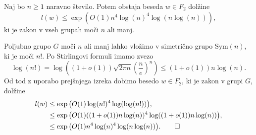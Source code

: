 \begin{posledica}\label{psl_zakon_v_splosni_grupi}
    Naj bo $n \ge 1$ naravno število. Potem obstaja beseda $w \in F_2$ dolžine \begin{equation*}
        l(w) \le \exp{\left( O(1) n^4 \log(n)^4 \log(n \log(n)) \right)},
    \end{equation*}
    ki je zakon v vseh grupah moči $n$ ali manj.
\end{posledica}
\begin{dokaz}
    Poljubno grupo $G$ moči $n$ ali manj lahko vložimo v simetrično grupo $\text{Sym}(n)$, ki je moči $n!$. Po Stirlingovi formuli imamo zvezo \begin{equation*}
       \log(n!) = \log \left( (1+ o(1)) \sqrt{2 \pi n} \left( \frac{n}{e} \right)^n   \right) \le (1 + o(1)) n \log(n).
    \end{equation*}
    Od tod z uporabo prejšnjega izreka dobimo besedo $w \in F_2$, ki je zakon v grupi $G$, dolžine \begin{align*}
        l(w) &\le  \exp{\left(O(1) \log(n!)^4 \log(\log(n!))\right)}, \\
            &\le \exp{\left(O(1) ((1 + o(1)) n \log(n))^4 \log((1 + o(1)) n \log(n))\right)}, \\
            &\le \exp{\left( O(1) n^4 \log(n)^4 \log(n \log(n)) \right)}. \qedhere
    \end{align*}\end{dokaz}







